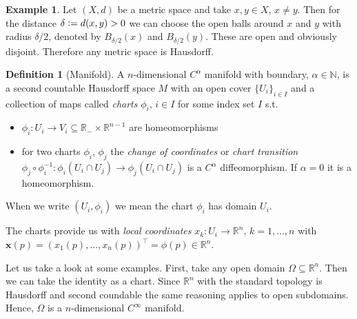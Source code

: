 \documentclass[12pt,a4paper]{article}
\numberwithin{equation}{subsection}
\numberwithin{lemma}{subsection}
\theoremstyle{definition}
\newtheorem{definition}[lemma]{Definition}
\newtheorem{example}[lemma]{Example}
\newcommand{\naturalnum}{\mathbb{N}}
\newcommand{\real}{\mathbb{R}}
\begin{document}
\begin{example}
    Let $(X,d)$ be a metric space and take 
    $x,y \in X$, $x\neq y$. Then for the distance 
    $\delta \vcentcolon= d(x,y) > 0$ we can choose the open balls around $x$ and 
    $y$ with radius 
    $\delta/2$, denoted by $B_{\delta/2}(x)$ and $B_{\delta/2}(y)$. These are 
    open and obviously disjoint. Therefore any metric space is Hausdorff. 
\end{example}

\begin{definition}[Manifold]
    A $n$-dimensional $C^\alpha$ manifold with boundary, $\alpha \in \naturalnum$, 
    is a second countable Hausdorff 
    space $M$ with an open cover $\{ U_i \} _{i\in I}$
    and a collection of maps called \textit{charts} $\phi_i$, $i\in I$ for 
    some index set $I$ s.t.
    \begin{itemize}
        \item $\phi_i: U_i \rightarrow V_i \subseteq \real_- \times \real^{n-1}$
            are homeomorphisms
        \item for two charts $\phi_i$, $\phi_j$ the 
            \textit{change of coordinates} or 
            \textit{chart transition} $\phi_j \circ \phi_i^{-1}: 
            \phi_i(U_i \cap U_j) \rightarrow \phi_j(U_i \cap U_j)$ 
            is a $C^\alpha$ diffeomorphism. If $\alpha=0$ it is a homeomorphism.
    \end{itemize}
    When we write $(U_i, \phi_i)$ we mean the chart $\phi_i$ has domain $U_i$.
\end{definition}
The charts provide us with \textit{local coordinates} $x_k: U_i \rightarrow \real^n$,
$k = 1, ..., n$ with $\mathbf{x}(p) = (x_1(p),...,x_n(p))^\top = \phi(p) \in \real^n$.

Let us take a look at some examples. First, take any open domain 
$\Omega \subseteq \real^n$. Then we can take the identity as a chart.
Since $\real^n$ with the standard topology is Hausdorff and second coundable
the same reasoning applies to open subdomains. Hence, $\Omega$ is a 
$n$-dimensional $C^\infty$ manifold. 
\end{document}
